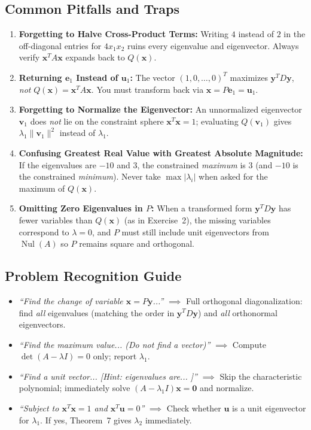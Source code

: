 \documentclass[11pt, letterpaper]{article}
\theoremstyle{definition}
\theoremstyle{remark}
\begin{document}
\subsection{Common Pitfalls and Traps}
\begin{enumerate}[label=\textbf{Trap \arabic*:}]
    \item \textbf{Forgetting to Halve Cross-Product Terms:} Writing $4$ instead of $2$ in the off-diagonal entries for $4x_1 x_2$ ruins every eigenvalue and eigenvector. Always verify $\mathbf{x}^T A \mathbf{x}$ expands back to $Q(\mathbf{x})$.
    \item \textbf{Returning $\mathbf{e}_1$ Instead of $\mathbf{u}_1$:} The vector $(1, 0, \dots, 0)^T$ maximizes $\mathbf{y}^T D \mathbf{y}$, \emph{not} $Q(\mathbf{x}) = \mathbf{x}^T A \mathbf{x}$. You must transform back via $\mathbf{x} = P\mathbf{e}_1 = \mathbf{u}_1$.
    \item \textbf{Forgetting to Normalize the Eigenvector:} An unnormalized eigenvector $\mathbf{v}_1$ does \emph{not} lie on the constraint sphere $\mathbf{x}^T \mathbf{x} = 1$; evaluating $Q(\mathbf{v}_1)$ gives $\lambda_1 \|\mathbf{v}_1\|^2$ instead of $\lambda_1$.
    \item \textbf{Confusing Greatest Real Value with Greatest Absolute Magnitude:} If the eigenvalues are $-10$ and $3$, the constrained \emph{maximum} is $3$ (and $-10$ is the constrained \emph{minimum}). Never take $\max |\lambda_i|$ when asked for the maximum of $Q(\mathbf{x})$.
    \item \textbf{Omitting Zero Eigenvalues in $P$:} When a transformed form $\mathbf{y}^T D \mathbf{y}$ has fewer variables than $Q(\mathbf{x})$ (as in Exercise~2), the missing variables correspond to $\lambda = 0$, and $P$ must still include unit eigenvectors from $\operatorname{Nul}(A)$ so $P$ remains square and orthogonal.
\end{enumerate}

\subsection{Problem Recognition Guide}
\begin{itemize}
    \item \emph{``Find the change of variable $\mathbf{x} = P\mathbf{y}$...''} $\implies$ Full orthogonal diagonalization: find \emph{all} eigenvalues (matching the order in $\mathbf{y}^T D \mathbf{y}$) and \emph{all} orthonormal eigenvectors.
    \item \emph{``Find the maximum value... (Do not find a vector)''} $\implies$ Compute $\det(A - \lambda I) = 0$ only; report $\lambda_1$.
    \item \emph{``Find a unit vector... [Hint: eigenvalues are... ]''} $\implies$ Skip the characteristic polynomial; immediately solve $(A - \lambda_1 I)\mathbf{x} = \mathbf{0}$ and normalize.
    \item \emph{``Subject to $\mathbf{x}^T \mathbf{x} = 1$ and $\mathbf{x}^T \mathbf{u} = 0$''} $\implies$ Check whether $\mathbf{u}$ is a unit eigenvector for $\lambda_1$. If yes, Theorem~7 gives $\lambda_2$ immediately.
\end{itemize}
\end{document}
